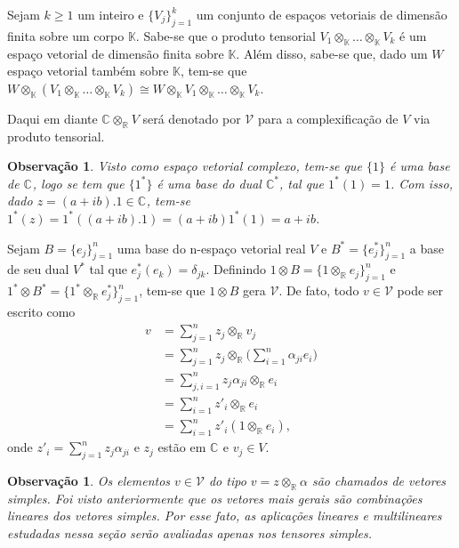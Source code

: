 \documentclass[12pt]{book}
\newtheorem{observacao}[teorema]{Observação}
\newcommand{\bigparenteses}[1]{\Big( #1 \Big) }
\newcommand{\colecaofinita}[2]{\{#1_{j} \}_{j=1}^{#2}}
\newcommand{\complexificacaotensorial}[1]{\complexo{}\otimes_{\reta} #1}
\newcommand{\complexificado}[1]{\mathcal{#1}}
\newcommand{\complexificacaoelemento}[2]{#1\otimes_{\reta} #2}
\newcommand{\complexo}[1]{\mathbb{C}^{#1}}
\newcommand{\produtotensorial}[2]{ #1_{1} \otimes_{\mathbb{K}} \dots \otimes_{\mathbb{K}} #1_{#2}}
\newcommand{\real}[1]{\mathbb{R}^{#1}}
\newcommand{\reta}{\real{}}
\begin{document}
	Sejam $k\geq 1$ um inteiro e $\{V_{j}\}_{j=1}^{k}$ um conjunto de espaços vetoriais de dimensão finita sobre um corpo $\mathbb{K}$. Sabe-se que o produto tensorial $\produtotensorial{V}{k}$ é um espaço vetorial de dimensão finita sobre $\mathbb{K}$. Além disso, sabe-se que, dado um $W$ espaço vetorial também sobre $\mathbb{K}$, tem-se que $W\otimes_{\mathbb{K}}(\produtotensorial{V}{k}) \cong W\otimes_{\mathbb{K}} \produtotensorial{V}{k}$. 
	
	Daqui em diante $ \complexificacaotensorial{V}$ será denotado por $\complexificado{V}$ para a complexificação de $V$ via produto tensorial.
	
	\begin{observacao}
		Visto como espaço vetorial complexo, tem-se que $\{1\}$ é uma base de $\complexo{}$, logo se tem que $\{1^{*}\}$ é uma base do dual $\complexo{*}$, tal que $1^{*}(1) = 1$. Com isso, dado $z = (a+ib).1 \in \complexo{}$, tem-se $1^{*}(z) = 1^{*}((a+ib).1) = (a+ib)1^{*}(1) = a+ib$.
	\end{observacao}
	
	Sejam $B = \colecaofinita{e}{n}$ uma base do n-espaço vetorial real $V$ e $B^{*} = \colecaofinita{e^{*}}{n}$ a base de seu dual $V^{*}$ tal que $e^{*}_{j}(e_{k}) =\delta_{jk}$. Definindo $1 \otimes B = \colecaofinita{\complexificacaoelemento{1}{e}}{n}$ e
	$1^{*} \otimes B^{*} = \colecaofinita{\complexificacaoelemento{1^{*}}{e^{*}}}{n}$, tem-se que $1\otimes B$ gera $\complexificado{V}$. De fato, todo $v \in \complexificado{V}$ pode ser escrito como 
	$$
	\begin{aligned}
	v &= \sum_{j=1}^{n} \complexificacaoelemento{z_{j}}{v_{j}}
	\\
	&= \sum_{j=1}^{n} \complexificacaoelemento{z_{j}}{\bigparenteses{\sum_{i=1}^{n}\alpha_{ji}e_{i}}} 
	\\
	&= \sum_{j,i=1}^{n}\complexificacaoelemento{z_{j}\alpha_{ji}}{e_{i}}
	\\
	&= \sum_{i=1}^{n}\complexificacaoelemento{z'_{i}}{e_{i}}
	\\
	&= \sum_{i=1}^{n}z'_{i}(\complexificacaoelemento{1}{e_{i}}),
	\end{aligned}
	$$
	onde $z'_{i} = \sum_{j=1}^{n}z_{j}\alpha_{ji}$ e $ z_{j}$ estão em $\complexo{}$ e $v_{j} \in V$.
	
	
	\begin{observacao}
		Os elementos $v \in \complexificado{V}$ do tipo $v = \complexificacaoelemento{z}{\alpha}$ são chamados de vetores simples. Foi visto anteriormente que os vetores mais gerais são combinações lineares dos vetores simples. Por esse fato, as aplicações lineares e multilineares estudadas nessa seção serão avaliadas apenas nos tensores simples.
	\end{observacao}
	
\end{document}
